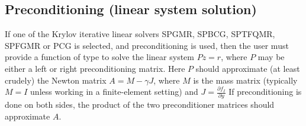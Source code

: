 \documentclass[letterpaper,10pt,english]{sphinxmanual}
\begin{document}
\subsection{Preconditioning (linear system solution)}
\label{c_interface/User_supplied:cinterface-precsolvefn}\label{c_interface/User_supplied:preconditioning-linear-system-solution}
If one of the Krylov iterative linear solvers SPGMR, SPBCG, SPTFQMR,
SPFGMR or PCG is selected, and preconditioning is used, then the user
must provide a function of type {\hyperref[c_interface/User_supplied:ARKSpilsPrecSolveFn]{}} to
solve the linear system $Pz=r$, where $P$ may be either a
left or right preconditioning matrix.  Here $P$ should
approximate (at least crudely) the Newton matrix $A=M-\gamma J$,
where $M$ is the mass matrix (typically $M=I$ unless
working in a finite-element setting) and $J = \frac{\partial
f_I}{\partial y}$  If preconditioning is done on both sides, the
product of the two preconditioner matrices should approximate
$A$.
\end{document}
